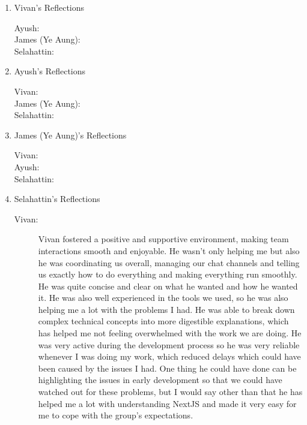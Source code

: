 \documentclass[a4paper, 12pt]{article}
\begin{document}
\begin{enumerate}
    \item Vivan's Reflections
        \begin{description}
            \item[Ayush: ] %
            \item[James (Ye Aung): ] %
            \item[Selahattin: ] %
        \end{description}
    \item Ayush's Reflections
        \begin{description}
            \item[Vivan: ] %
            \item[James (Ye Aung): ] %
            \item[Selahattin: ] %
        \end{description}
    \item James (Ye Aung)'s Reflections
        \begin{description}
            \item[Vivan: ] %
            \item[Ayush: ] %
            \item[Selahattin: ] %
        \end{description}
    \item Selahattin's Reflections
        \begin{description}
            \item[Vivan: ] Vivan fostered a positive and supportive environment, making team interactions smooth and enjoyable. He wasn’t only helping me but also he was coordinating us overall, managing our chat channels and telling us exactly how to do everything and making everything run smoothly. He was quite concise and clear on what he wanted and how he wanted it. He was also well experienced in the tools we used, so he was also helping me a lot with the problems I had. He was able to break down complex technical concepts into more digestible explanations, which has helped me not feeling overwhelmed with the work we are doing. He was very active during the development process so he was very reliable whenever I was doing my work, which reduced delays which could have been caused by the issues I had. One thing he could have done can be highlighting the issues in early development so that we could have watched out for these problems, but I would say other than that he has helped me a lot with understanding NextJS and made it very easy for me to cope with the group’s expectations.

\end{description}
\end{enumerate}
\end{document}
